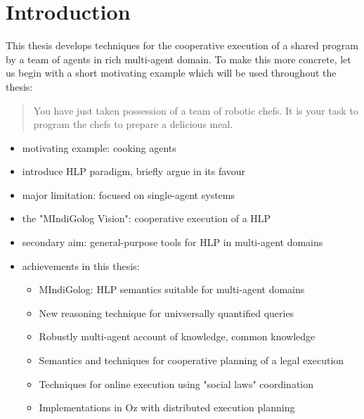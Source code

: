 \chapter{Introduction}

This thesis develops techniques for the cooperative execution of a shared 
program by a team of agents in rich multi-agent domain.  To make this more 
concrete, let us begin with a short motivating example which will be used 
throughout the thesis:

\begin{quote}
You have just taken possession of a team of robotic chefs.  It is your 
task to program the chefs to prepare a delicious meal.
\end{quote} 



\begin{itemize}
\item motivating example: cooking agents
\item introduce HLP paradigm, briefly argue in its favour
\item major limitation: focused on single-agent systems
\item the "MIndiGolog Vision": cooperative execution of a HLP
\item secondary aim: general-purpose tools for HLP in multi-agent domains
\item achievements in this thesis:
  \begin{itemize}
  \item MIndiGolog: HLP semantics suitable for multi-agent domains
  \item New reasoning technique for univsersally quantified queries
  \item Robustly multi-agent account of knowledge, common knowledge
  \item Semantics and techniques for cooperative planning of a legal execution
  \item Techniques for online execution using "social laws" coordination
  \item Implementations in Oz with distributed execution planning
  \end{itemize}
\end{itemize}

